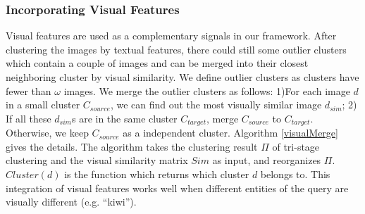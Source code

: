 \subsubsection{Incorporating Visual Features}
Visual features are used as a complementary signals in our framework.
After clustering the images by textual features,
there could still some outlier clusters which contain a couple of images and
can be merged into their closest neighboring cluster by visual similarity.
We define outlier clusters as clusters have fewer than $\omega$ images.
We merge the outlier clusters as follows:
1)For each image $d$ in a small cluster $C_{source}$,
we can find out the most visually similar image $d_{sim}$;
2) If all these $d_{sim}$s are in the same cluster $C_{target}$,
merge $C_{source}$ to $C_{target}$.
Otherwise, we keep $C_{source}$ as a independent cluster.
Algorithm \ref{visualMerge} gives the details.
The algorithm takes the clustering result $\Pi$ of tri-stage clustering
and the visual similarity matrix $Sim$ as input, and reorganizes $\Pi$.
$Cluster(d)$ is the function which returns which cluster $d$ belongs to.
This integration of visual features works well when different
entities of the query are visually different (e.g. ``kiwi'').


